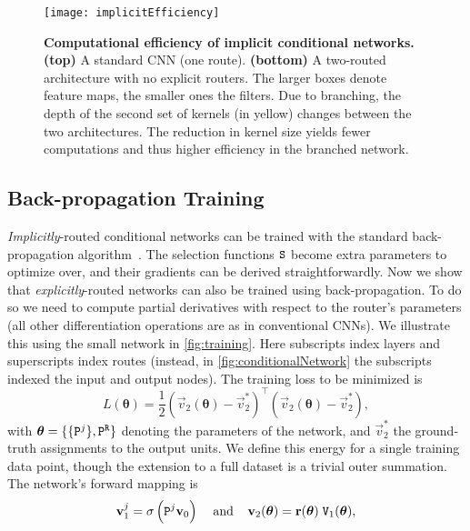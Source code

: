 \documentclass[thesis]{subfiles}
\begin{document}
	\begin{figure}[tbp]
	\centerline{
	\texttt{[image: implicitEfficiency]}
	}
	\caption[Computational efficiency of implicit conditional networks]{{\bf Computational efficiency of implicit conditional networks.} 
	{\bf (top)} A standard CNN (one route).
	{\bf (bottom)} A two-routed architecture with no explicit routers.
	The larger boxes denote feature maps, the smaller ones the filters.
	Due to branching, the depth of the second set of kernels (in yellow) changes between the two architectures.
	The reduction in kernel size yields fewer computations and thus higher efficiency in the branched network.
	}
	\label{fig:implicitEfficiency}
	\end{figure}
	
	\subsection{Back-propagation Training}\label{sec:training}
	{\em Implicitly}-routed conditional networks can be trained with the standard back-propagation algorithm~\cite{Krizhevsky2012,Szegedy2014going}. 
	The selection functions $\mat S$ become extra parameters to optimize over, and their gradients can be derived straightforwardly. 
	Now we show that {\em explicitly}-routed networks can also be trained using back-propagation.  
	To do so we need to compute partial derivatives with respect to the router's parameters (all other differentiation operations are as in conventional CNNs). 
	We illustrate this using the small network in \cref{fig:training}. 
	Here subscripts index layers and superscripts index routes (instead, in \cref{fig:conditionalNetwork} the subscripts indexed the input and output nodes).
	The training loss to be minimized is
	\begin{equation}
	L(\boldsymbol\theta)  = \frac{1}{2} \left(\vec v_2(\boldsymbol\theta) - \vec v_2^*\right)^\top \left(\vec v_2(\boldsymbol\theta) - \vec v_2^*\right),
	\end{equation}
	with $\boldsymbol\theta = \{ \{ \mat P^j \}, \mat P^{\tt R} \} $ denoting the parameters of the network, and $\vec v_2^*$ the ground-truth assignments to the output units. We define this energy for a single training data point, though the extension to a full dataset is a trivial outer summation.
	The network's forward mapping is
	\begin{equation}
	\vec v_1^j = \sigma \left( \mat P^j \vec v_0 \right) \;\;\;\; \textrm{and} \;\;\;\; \vec v_2(\boldsymbol\theta) = \vec r(\boldsymbol\theta) \; \mat V_1(\boldsymbol\theta),
	\end{equation} 
\end{document}
